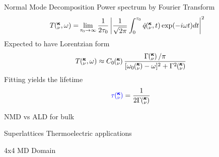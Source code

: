 \documentclass{beamer}
\newcommand{\kvt}{\mspace{-4.0mu}\left(\mspace{-8.0mu}
\begin{smallmatrix}&\pmb{\kappa} \\&\nu\end{smallmatrix}
\mspace{-2.0mu},t\right)}
\newcommand{\kvw}{\mspace{-4.0mu}\left(\mspace{-8.0mu}
\begin{smallmatrix}&\pmb{\kappa} \\&\nu\end{smallmatrix}
\mspace{-2.0mu},\omega\right)}
\newcommand{\kv}{\mspace{-4.0mu}\left(\mspace{-8.0mu}
\begin{smallmatrix}&\pmb{\kappa} \\&\nu\end{smallmatrix}
\mspace{-3.0mu}\right)}
\begin{document}
\begin{frame}{Normal Mode Decomposition}
Power spectrum by Fourier Transform
\begin{equation}\label{EQ:NMD:SED}
\begin{split}
T\kvw=&\lim_{\tau_0\rightarrow\infty}\frac{1}{2\tau_0}\left|\frac{1}{\sqrt{2\pi}}\int_{0}^{\tau_0}\dot{q}\kvt\exp(-i\omega t)dt\right|^2
\end{split}
\end{equation}
Expected to have Lorentzian form
\begin{equation}\label{EQ:NMD:LOR}
T\kvw \approx C_0\kv\frac{\Gamma\kv/\pi}{[\omega_0\kv-\omega]^2+\Gamma^2\kv}
\end{equation}
Fitting yields the lifetime
\begin{equation}\label{EQ:lifetime}
\textcolor{blue}{\tau\kv}=\frac{1}{2\Gamma\kv}
\end{equation}

\end{frame}
\begin{frame}{NMD vs ALD for bulk}
\begin{figure}[t]
\begin{center}
\vspace*{-0.8cm}
\renewcommand{\figure}{Fig.}
\label{fig:nmd_v_ald_bulk}
\end{center}
\end{figure}
\end{frame}

\begin{frame}{Superlattices}
Thermoelectric applications

\end{frame}


\begin{frame}{\small{4x4 MD Domain}}
\begin{figure}[t]
\begin{center}
\vspace*{-0.8cm}
\renewcommand{\figure}{Fig.}
\label{fig:md_domain}
\end{center}
\end{figure}
\end{frame}
\end{document}
